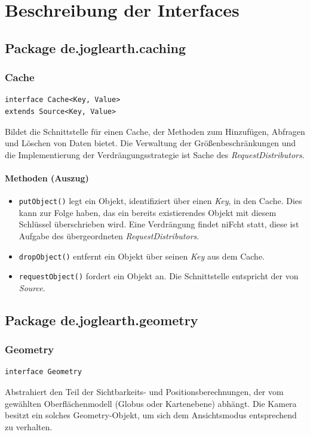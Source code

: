 \documentclass[10pt]{scrreprt}
\begin{document}
\chapter{Beschreibung der Interfaces}

\section{Package de.joglearth.caching}
\subsection*{Cache}
\begin{lstlisting}
interface Cache<Key, Value>
extends Source<Key, Value>
\end{lstlisting}
Bildet die Schnittstelle für einen Cache, der Methoden zum Hinzufügen, Abfragen und Löschen von Daten bietet. Die Verwaltung der Größenbeschränkungen und die Implementierung der Verdrängungsstrategie ist Sache des \textit{RequestDistributors}.\\
\subsubsection*{Methoden (Auszug)}
\begin{itemize}
\item \texttt{putObject()} legt ein Objekt, identifiziert über einen \textit{Key}, in den Cache. Dies kann zur Folge haben, das ein bereits existierendes Objekt mit diesem Schlüssel überschrieben wird. Eine Verdrängung findet niFcht statt, diese ist Aufgabe des übergeordneten \textit{RequestDistributors}.
\item \texttt{dropObject()} entfernt ein Objekt über seinen \textit{Key} aus dem Cache.
\item \texttt{requestObject()} fordert ein Objekt an. Die Schnittstelle entspricht der von \textit{Source}.
\end{itemize}
\vspace{5mm}


\section{Package de.joglearth.geometry}
\subsection*{Geometry}
\begin{lstlisting}
interface Geometry
\end{lstlisting}
Abstrahiert den Teil der Sichtbarkeits- und Positionsberechnungen, der vom gewählten Oberflächenmodell (Globus oder Kartenebene) abhängt. Die Kamera besitzt ein solches Geometry-Objekt, um sich dem Ansichtsmodus entsprechend zu verhalten.\\
\end{document}
